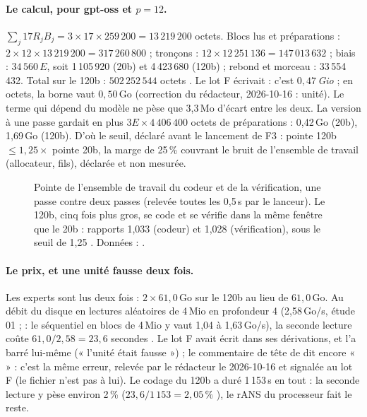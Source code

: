 \paragraph{Le calcul, pour gpt-oss et $p = 12$.} $\sum_j 17 R_j B_j = 3 \times 17 \times 259\,200 = 13\,219\,200$ octets. Blocs lus et préparations : $2 \times 12 \times 13\,219\,200 = 317\,260\,800$ ; tronçons : $12 \times 12\,251\,136 = 147\,013\,632$ ; biais : $34\,560\,E$, soit 1\,105\,920 (20b) et 4\,423\,680 (120b) ; rebond et morceau : 33\,554\,432. Total sur le 120b : $502\,252\,544$ octets \calc. Le lot F écrivait  : c'est $0{,}47$\,\emph{Gio} ; en octets, la borne vaut $0{,}50$\,Go (correction du rédacteur, 2026-10-16 : unité). Le terme qui dépend du modèle ne pèse que 3,3\,Mo d'écart entre les deux. La version à une passe gardait en plus $3 E \times 4\,406\,400$ octets de préparations : 0,42\,Go (20b), 1,69\,Go (120b). D'où le seuil, déclaré avant le lancement de F3 : pointe 120b $\le 1{,}25 \times$ pointe 20b, la marge de 25\,\% couvrant le bruit de l'ensemble de travail (allocateur, fils), déclarée et non mesurée.

\begin{figure}[ht]
\centering
\TdFmtGraphePointes
\caption[Pointe de mémoire du codeur et de la vérification]{Pointe de l'ensemble de travail du codeur et de la vérification, une passe contre deux passes (relevée toutes les 0,5\,s par le lanceur). Le 120b, cinq fois plus gros, se code et se vérifie dans la même fenêtre que le 20b : rapports 1,033 (codeur) et 1,028 (vérification), sous le seuil de 1,25 \mes. Données : .}
\label{t2fmt:fig:pointes}
\end{figure}

\paragraph{Le prix, et une unité fausse deux fois.} Les experts sont lus deux fois : $2 \times 61{,}0$\,Go sur le 120b au lieu de $61{,}0$\,Go. Au débit du disque en lectures aléatoires de 4\,Mio en profondeur 4 (2,58\,Go/s, étude 01 ;  : le séquentiel en blocs de 4\,Mio y vaut 1,04 à 1,63\,Go/s), la seconde lecture coûte $61{,}0 / 2{,}58 = 23{,}6$ secondes \calc. Le lot F avait écrit  dans ses dérivations, et l'a barré lui-même (« l'unité était fausse ») ; le commentaire de tête de  dit encore «  » : c'est la même erreur, relevée par le rédacteur le 2026-10-16 et signalée au lot F (le fichier n'est pas à lui). Le codage du 120b a duré 1\,153\,s en tout : la seconde lecture y pèse environ 2\,\% ($23{,}6 / 1\,153 = 2{,}05\,\%$ \calc), le rANS du processeur fait le reste.

